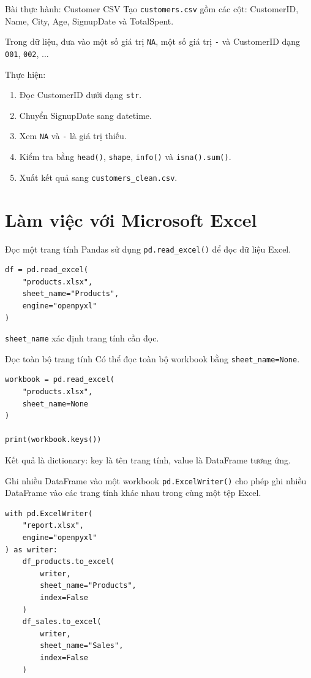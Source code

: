 \documentclass[aspectratio=169,11pt]{beamer}
\newcommand{\code}[1]{\texttt{#1}}
\newcommand{\smallgap}{\vspace{0.4em}}
\begin{document}
\begin{frame}{Bài thực hành: Customer CSV}
Tạo \code{customers.csv} gồm các cột: CustomerID, Name, City, Age, SignupDate và TotalSpent.

\smallgap
Trong dữ liệu, đưa vào một số giá trị \code{NA}, một số giá trị \code{-} và CustomerID dạng \code{001}, \code{002}, ...

\smallgap
Thực hiện:
\begin{enumerate}
  \item Đọc CustomerID dưới dạng \code{str}.
  \item Chuyển SignupDate sang datetime.
  \item Xem \code{NA} và \code{-} là giá trị thiếu.
  \item Kiểm tra bằng \code{head()}, \code{shape}, \code{info()} và \code{isna().sum()}.
  \item Xuất kết quả sang \code{customers\_clean.csv}.
\end{enumerate}
\end{frame}

\section{Làm việc với Microsoft Excel}

\begin{frame}[fragile]{Đọc một trang tính}
Pandas sử dụng \code{pd.read\_excel()} để đọc dữ liệu Excel.

\begin{lstlisting}[style=pythonstyle]
df = pd.read_excel(
    "products.xlsx",
    sheet_name="Products",
    engine="openpyxl"
)
\end{lstlisting}

\code{sheet\_name} xác định trang tính cần đọc.
\end{frame}

\begin{frame}[fragile]{Đọc toàn bộ trang tính}
Có thể đọc toàn bộ workbook bằng \code{sheet\_name=None}.

\begin{lstlisting}[style=pythonstyle]
workbook = pd.read_excel(
    "products.xlsx",
    sheet_name=None
)

print(workbook.keys())
\end{lstlisting}

Kết quả là dictionary: key là tên trang tính, value là DataFrame tương ứng.
\end{frame}

\begin{frame}[fragile]{Ghi nhiều DataFrame vào một workbook}
\code{pd.ExcelWriter()} cho phép ghi nhiều DataFrame vào các trang tính khác nhau trong cùng một tệp Excel.

\begin{lstlisting}[style=pythonstyle]
with pd.ExcelWriter(
    "report.xlsx",
    engine="openpyxl"
) as writer:
    df_products.to_excel(
        writer,
        sheet_name="Products",
        index=False
    )
    df_sales.to_excel(
        writer,
        sheet_name="Sales",
        index=False
    )
\end{lstlisting}
\end{frame}
\end{document}
